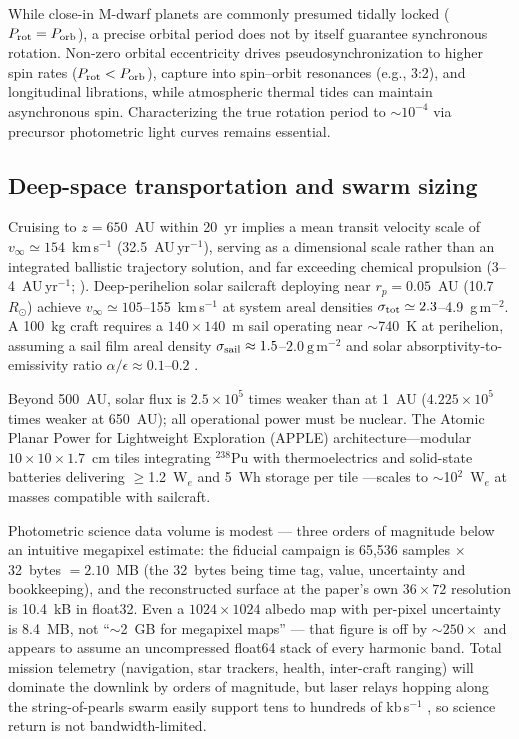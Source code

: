\documentclass[twocolumn,10pt]{article}
\begin{document}
 While
close-in M-dwarf planets are commonly presumed tidally locked ($P_{\rm rot}=P_{\rm orb}$),
a precise orbital period does not by itself guarantee synchronous rotation.
Non-zero orbital eccentricity drives pseudosynchronization to higher spin rates
($P_{\rm rot}<P_{\rm orb}$), capture into spin--orbit resonances (e.g., 3:2),
and longitudinal librations, while atmospheric thermal tides can maintain
asynchronous spin. Characterizing the true rotation period to $\sim10^{-4}$
via precursor photometric light curves remains essential.

\subsection{Deep-space transportation and swarm sizing}
\label{sec:sail}
Cruising to $z=650$~AU within 20~yr implies a mean transit velocity scale of
$v_\infty\simeq154$~km\,s$^{-1}$ (32.5~AU\,yr$^{-1}$), serving as a dimensional scale
rather than an integrated ballistic trajectory solution, and far exceeding chemical
propulsion (3--4~AU\,yr$^{-1}$; \citealt{tur26prop}). Deep-perihelion solar sailcraft
deploying near $r_p=0.05$~AU (10.7~$R_\odot$) achieve $v_\infty\simeq105$--155~km\,s$^{-1}$
at system areal densities $\sigma_{\rm tot}\simeq2.3$--4.9~g\,m$^{-2}$.
A 100~kg craft requires a $140\times140$~m sail operating near $\sim$740~K
at perihelion, assuming a sail film areal density $\sigma_{\rm sail}\approx1.5$--$2.0\ \mathrm{g\,m^{-2}}$
and solar absorptivity-to-emissivity ratio $\alpha/\epsilon\approx0.1$--$0.2$
\citep{niac20,helvajian23,friedman24,tur26prop}.

Beyond 500~AU, solar flux is $2.5\times10^5$ times weaker than at 1~AU
($4.225\times10^5$ times weaker at 650~AU); all operational power must be nuclear.
The Atomic Planar Power for Lightweight
Exploration (APPLE) architecture---modular $10\times10\times1.7$~cm tiles
integrating $^{238}$Pu with thermoelectrics and solid-state batteries
delivering $\ge$1.2~W$_e$ and 5~Wh storage per tile \citep{apple22}---scales
to $\sim$10$^2$~W$_e$ at masses compatible with sailcraft.

Photometric science data volume is modest --- three orders of magnitude
below an intuitive megapixel estimate: the fiducial campaign is 65{,}536 samples $\times$ 32~bytes
$=2.10$~MB (the 32~bytes being time tag, value, uncertainty and bookkeeping),
and the reconstructed surface at the paper's own $36\times72$ resolution is
10.4~kB in float32. Even a $1024\times1024$ albedo map with per-pixel uncertainty
is 8.4~MB, not ``$\sim$2~GB for megapixel maps'' --- that figure is off by
$\sim250\times$ and appears to assume an uncompressed float64 stack of
every harmonic band. Total mission telemetry (navigation, star trackers,
health, inter-craft ranging) will dominate the downlink by orders of magnitude,
but laser relays hopping along the string-of-pearls swarm easily support tens
to hundreds of kb\,s$^{-1}$ \citep{helvajian23}, so science return is not
bandwidth-limited.
\end{document}
